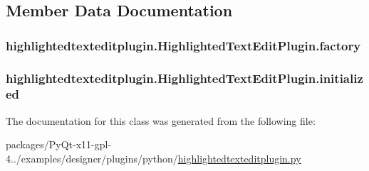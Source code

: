 \subsection{Member Data Documentation}
\hypertarget{classhighlightedtexteditplugin_1_1HighlightedTextEditPlugin_a543655d181fa59a15e8cefc7023bba07}{}
\subsubsection[{factory}]{\setlength{\rightskip}{0pt plus 5cm}highlightedtexteditplugin.\+Highlighted\+Text\+Edit\+Plugin.\+factory}\label{classhighlightedtexteditplugin_1_1HighlightedTextEditPlugin_a543655d181fa59a15e8cefc7023bba07}
\hypertarget{classhighlightedtexteditplugin_1_1HighlightedTextEditPlugin_ab61f5541b65bb10aeede3dc35b070be0}{}
\subsubsection[{initialized}]{\setlength{\rightskip}{0pt plus 5cm}highlightedtexteditplugin.\+Highlighted\+Text\+Edit\+Plugin.\+initialized}\label{classhighlightedtexteditplugin_1_1HighlightedTextEditPlugin_ab61f5541b65bb10aeede3dc35b070be0}


The documentation for this class was generated from the following file\+:\begin{DoxyCompactItemize}
\item 
packages/\+Py\+Qt-\/x11-\/gpl-\/4../examples/designer/plugins/python/\hyperlink{highlightedtexteditplugin_8py}{highlightedtexteditplugin.\+py}\end{DoxyCompactItemize}
